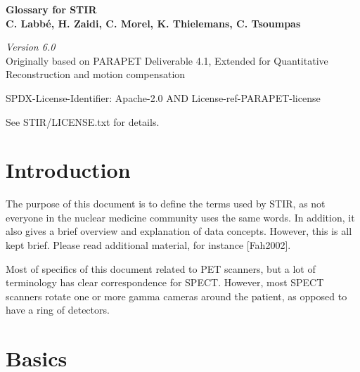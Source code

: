 \documentclass{article}
\begin{document}
\begin{center}
\textbf{{\huge Glossary for STIR}}\\
\textbf{C. Labb\'{e}, H. Zaidi, C. Morel, K. Thielemans, C. Tsoumpas}
\end{center}

\begin{center}
\textit{Version 6.0}\\
Originally based on PARAPET Deliverable 4.1,
Extended for Quantitative Reconstruction and motion compensation

\end{center}

SPDX-License-Identifier: Apache-2.0 AND License-ref-PARAPET-license

See STIR/LICENSE.txt for details.

\section*{Introduction}
The purpose of this document is to define the terms used by STIR, as not everyone in the nuclear 
medicine community uses the same words. In addition, it also gives a brief overview and explanation 
of data concepts. However, this is all kept brief. Please read additional material, for instance
[Fah2002].

Most of specifics of this document related to PET scanners, but a lot of terminology has clear
correspondence for SPECT. However, most SPECT scanners rotate one or more gamma cameras around
the patient, as opposed to have a ring of detectors.

\section*{Basics}
\end{document}
